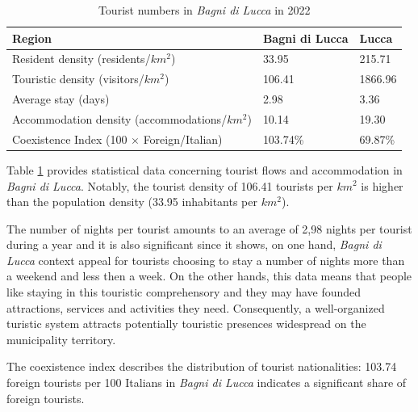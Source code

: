 \documentclass[sustainability,article,submit,pdftex,moreauthors]{Definitions/mdpi}
\begin{document}
\begin{table}
    \footnotesize
    \centering
    \begin{tabular}{l||l|l} \hline 
        {\bf Region} & {\bf Bagni di Lucca} & {\bf Lucca} \\ \hline
        Resident density (residents/{$km^2$}) & 33.95 & 215.71 \\
        Touristic density (visitors/{$km^2$}) & 106.41 & 1866.96 \\
        Average stay  (days) &  2.98 &  3.36 \\
        Accommodation density (accommodations/{$km^2$}) & 10.14 & 19.30 \\
        Coexistence Index (100 $\times$ Foreign/Italian) & 103.74\% &  69.87\% \\ 
         \hline
    \end{tabular}
    \caption{Tourist numbers in \emph{Bagni di Lucca} in 2022}
    \label{tab:tourism}
\end{table}

Table \ref{tab:tourism} provides statistical data concerning tourist flows and accommodation in \emph{Bagni di Lucca}. Notably, the tourist density of 106.41 tourists per $km^2$ is higher than the population density (33.95 inhabitants per $km^2$).

The number of nights per tourist amounts to an average of 2,98 nights per tourist during a year and it is also significant since it shows, on one hand, \emph{Bagni di Lucca} context appeal for tourists choosing to stay a number of nights more than a weekend and less then a week. On the other hands, this data means that people like staying in this touristic comprehensory and they may have founded attractions, services and activities they need. Consequently, a well-organized turistic system attracts potentially touristic presences widespread on the municipality territory.

The coexistence index describes the distribution of tourist nationalities: 103.74 foreign tourists per 100 Italians in \emph{Bagni di Lucca} indicates a significant share of foreign tourists.
\end{document}
